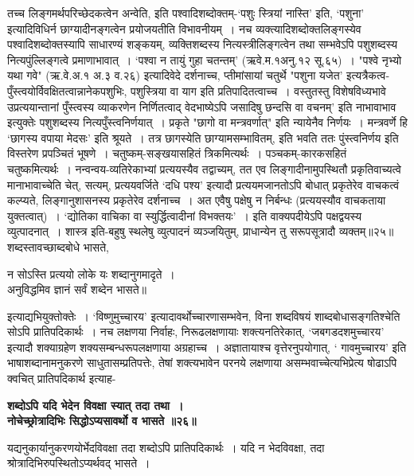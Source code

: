 {{{{ तच्च लिङ्गमर्थपरिच्छेदकत्वेन अन्वेति, इति पश्वादिशब्दोक्तम्-`पशुः स्त्रियां नास्ति' इति, `पशुना' इत्यादिविधिर्न छाग्यादीनङ्गत्वेन प्रयोजयतीति विभावनीयम्~।
नच व्यक्त्यादिशब्दोक्तलिङ्गस्येव पश्वादिशब्दोक्तस्यापि साधारण्यं शङ्कयम्, व्यक्तिशब्दस्य नित्यस्त्रीलिङ्गत्वेन तथा सम्भवेऽपि पशुशब्दस्य नित्यपुंल्लिङ्गत्वे प्रमाणाभावात्~।
 `पश्वा न तायुं गुहा चतन्तम्' (ऋवे.म.१अनु.१२ सू.६५)~।
 "पश्वे नृभ्यो यथा गवे" (ऋ.वे.अ.१ अ.३ व.२६) इत्यादिवेदे दर्शनाच्च, प्तीमांसायां चतुर्थे "पशुना यजेत' इत्यत्रैकत्व-पुँस्त्वयोर्विवक्षितत्वान्नानेकपशुभिः, पशुस्त्रिया वा याग इति प्रतिपादितत्वाच्च~।
 वस्तुतस्तु विशेषविध्यभावे उप्रत्ययान्तानां पुँस्त्वस्य व्याकरणेन निर्णितत्वाद् वेदभाष्येऽपि जसादिषु छन्दसि वा वचनम्' इति नाभावाभाव इत्युक्तेः पशुशब्दस्य नित्यपुँस्त्वनिर्णयात्~।
प्रकृते "छागो वा मन्त्रवर्णात्" इति न्यायेनैव निर्णयः~।
मन्त्रवर्णे हि `छागस्य वपाया मेदसः' इति श्रूयते~।
तत्र छागस्येति छाग्यामसम्भावितम्, इति भवति ततः पुंस्त्वनिर्णय इति विस्तरेण प्रपञ्चितं भूषणे~।
 चतुष्कम्-सङ्खयासहितं त्रिकमित्यर्थः~।
 पञ्चकम्-कारकसहितं चतुष्कमित्यर्थः~।
 नन्वन्वय-व्यतिरेकाभ्यां प्रत्ययस्यैव तद्वाच्यम्, तत एव लिङ्गादीनामुपस्थितौ प्रकृतिवाच्यत्वे मानाभावाच्चेति चेत्, सत्यम्, प्रत्ययवर्जिते `दधि पश्य' इत्यादौ प्रत्ययमजानतोऽपि बोधात् प्रकृतेरेव वाचकत्वं कल्प्यते, लिङ्गानुशासनस्य प्रकृतेरेव दर्शनाच्च~।
 अत एवैषु पक्षेषु न निर्बन्धः (प्रत्ययस्यौव वाचकताया युक्तत्वात्)~।
 `द्योतिका वाचिका वा स्युर्द्धित्वादीनां विभक्तयः'~। 
 इति वाक्यपदीयेऽपि पक्षद्वयस्य व्युत्पादनात्~।
 शास्त्र इति-बहुषु स्थलेषु व्युत्पादनं व्यञ्जयितुम्, प्राधान्येन तु सरूपसूत्रादौ व्यक्तम्॥२५॥
 शब्दस्तावच्छाब्दबोधे भासते,
\begin{center}न सोऽस्ति प्रत्ययो लोके यः शब्दानुगमादृते~।\\
 अनुविद्धमिव ज्ञानं सर्वं शब्देन भासते॥\end{center}
इत्याद्यभियुक्तोक्तेः~।
 `विष्णुमुच्चारय' इत्यादावर्थोच्चारणासम्भवेन, विना शब्दविषयं शाब्दबोधासङ्गतिश्चेति सोऽपि प्रातिपदिकार्थः~।
 नच लक्षणया निर्वाहः, निरूढलक्षणायाः शक्त्यनतिरेकात्, `जबगडदशमुच्चारय' इत्यादौ शक्याग्रहेण शक्यसम्बन्धरूपलक्षणाया अग्रहाच्च~।
 अज्ञातायाश्च वृत्तेरनुपयोगात्, ` गावमुच्चारय' इति भाषाशब्दानामनुकरणे साधुतासम्प्रतिपत्तेः, तेषां शक्त्यभावेन परनये लक्षणाया असम्भवाच्चेत्यभिप्रेत्य षोढाऽपि क्वचित् प्रातिपदिकार्थ इत्याह-
 \begin{center}{\bfseries शब्दोऽपि यदि भेदेन विवक्षा स्यात् तदा तथा~।\\
 नोचेच्छ्रोत्रादिभिः सिद्धोऽप्यसावर्थो व भासते ॥२६॥}\end{center}
 यद्यनुकार्यानुकरणयोर्भेदविवक्षा तदा शब्दोऽपि प्रातिपदिकार्थः~।
यदि न भेदविवक्षा, तदा श्रोत्रादिभिरुपस्थितोऽप्यर्थवद् भासते~।
}}}}
